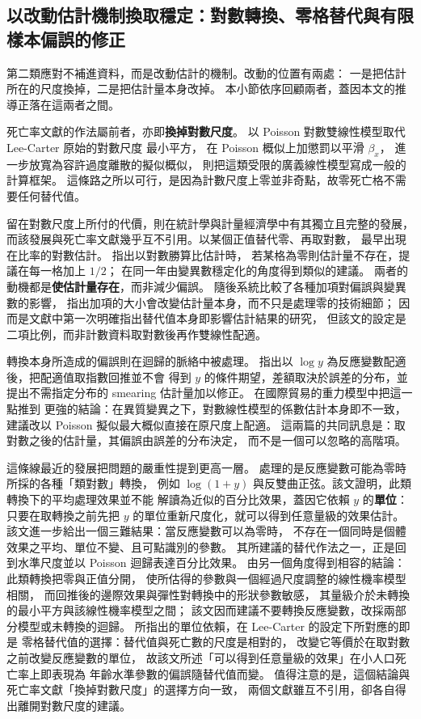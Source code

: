 
\subsection{以改動估計機制換取穩定：對數轉換、零格替代與有限樣本偏誤的修正}\label{sec:logzero}\label{sec:biasred}

第二類應對不補進資料，而是改動估計的機制。改動的位置有兩處：
一是把估計所在的尺度換掉，二是把估計量本身改掉。
本小節依序回顧兩者，蓋因本文的推導正落在這兩者之間。

死亡率文獻的作法屬前者，亦即\textbf{換掉對數尺度}。
\citet{brouhns2002} 以 Poisson 對數雙線性模型取代 Lee-Carter 原始的對數尺度
最小平方，\citet{delwarde2007} 在 Poisson 概似上加懲罰以平滑 $\beta_x$，
\citet{djeundje2010} 進一步放寬為容許過度離散的擬似概似，
\citet{currie2013} 則把這類受限的廣義線性模型寫成一般的計算框架。
這條路之所以可行，是因為計數尺度上零並非奇點，故零死亡格不需要任何替代值。

留在對數尺度上所付的代價，則在統計學與計量經濟學中有其獨立且完整的發展，
而該發展與死亡率文獻幾乎互不引用。以某個正值替代零、再取對數，
最早出現在比率的對數估計。\citet{haldane1956} 指出以對數勝算比估計時，
若某格為零則估計量不存在，提議在每一格加上 $1/2$；
\citet{anscombe1956} 在同一年由變異數穩定化的角度得到類似的建議。
兩者的動機都是\textbf{使估計量存在}，而非減少偏誤。
\citet{gart1967} 隨後系統比較了各種加項對偏誤與變異數的影響，
指出加項的大小會改變估計量本身，而不只是處理零的技術細節；
\citet{gart1967} 因而是文獻中第一次明確指出替代值本身即影響估計結果的研究，
但該文的設定是二項比例，而非計數資料取對數後再作雙線性配適。

轉換本身所造成的偏誤則在迴歸的脈絡中被處理。
\citet{duan1983} 指出以 $\log y$ 為反應變數配適後，把配適值取指數回推並不會
得到 $y$ 的條件期望，差額取決於誤差的分布，並提出不需指定分布的 smearing
估計量加以修正。\citet{santossilva2006} 在國際貿易的重力模型中把這一點推到
更強的結論：在異質變異之下，對數線性模型的係數估計本身即不一致，
建議改以 Poisson 擬似最大概似直接在原尺度上配適。
這兩篇的共同訊息是：取對數之後的估計量，其偏誤由誤差的分布決定，
而不是一個可以忽略的高階項。

這條線最近的發展把問題的嚴重性提到更高一層。
\citet{chenroth2024} 處理的是反應變數可能為零時所採的各種「類對數」轉換，
例如 $\log(1+y)$ 與反雙曲正弦。該文證明，此類轉換下的平均處理效果並不能
解讀為近似的百分比效果，蓋因它依賴 $y$ 的\textbf{單位}：
只要在取轉換之前先把 $y$ 的單位重新尺度化，就可以得到任意量級的效果估計。
該文進一步給出一個三難結果：當反應變數可以為零時，
不存在一個同時是個體效果之平均、單位不變、且可點識別的參數。
其所建議的替代作法之一，正是回到水準尺度並以 Poisson 迴歸表達百分比效果。
\citet{mullahy2024} 由另一個角度得到相容的結論：此類轉換把零與正值分開，
使所估得的參數與一個經過尺度調整的線性機率模型相關，
而回推後的邊際效果與彈性對轉換中的形狀參數敏感，
其量級介於未轉換的最小平方與該線性機率模型之間；
該文因而建議不要轉換反應變數，改採兩部分模型或未轉換的迴歸。
\citet{chenroth2024} 所指出的單位依賴，在 Lee-Carter 的設定下所對應的即是
零格替代值的選擇：替代值與死亡數的尺度是相對的，
改變它等價於在取對數之前改變反應變數的單位，
故該文所述「可以得到任意量級的效果」在小人口死亡率上即表現為
年齡水準參數的偏誤隨替代值而變。
值得注意的是，這個結論與死亡率文獻「換掉對數尺度」的選擇方向一致，
兩個文獻雖互不引用，卻各自得出離開對數尺度的建議。

